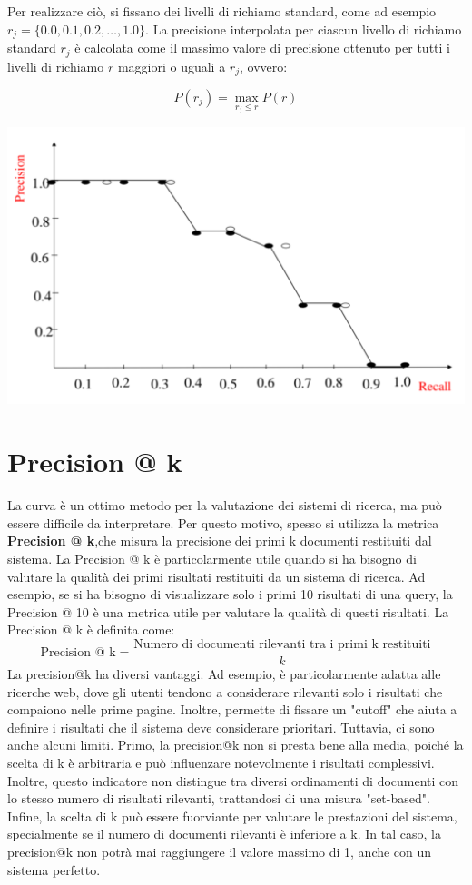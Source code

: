 \documentclass{report}
\begin{document}
	Per realizzare ciò, si fissano dei livelli di richiamo standard, come ad esempio \( r_j = \{0.0, 0.1, 0.2, \ldots, 1.0\} \). La precisione interpolata per ciascun livello di richiamo standard \( r_j \) è calcolata come il massimo valore di precisione ottenuto per tutti i livelli di richiamo \( r \) maggiori o uguali a \( r_j \), ovvero:
	
	\[
	P(r_j) = \max_{r_j \leq r} P(r)
	\]
	\begin{center}
		\includegraphics[scale=0.3]{assets/interpolated-pre-rec-graph.png}
	\end{center}

	\section{Precision @ k}
	La curva è un ottimo metodo per la valutazione dei sistemi di ricerca, ma può essere difficile da interpretare. Per questo motivo, spesso si utilizza la metrica \textbf{Precision @ k},che misura la precisione dei primi k documenti restituiti dal sistema. La Precision @ k è particolarmente utile quando si ha bisogno di valutare la qualità dei primi risultati restituiti da un sistema di ricerca. Ad esempio, se si ha bisogno di visualizzare solo i primi 10 risultati di una query, la Precision @ 10 è una metrica utile per valutare la qualità di questi risultati. La Precision @ k è definita come:
	\[
		\text{Precision @ k} = \frac{\text{Numero di documenti rilevanti tra i primi k restituiti}}{k}
	\]
	La precision@k ha diversi vantaggi. Ad esempio, è particolarmente adatta alle ricerche web, dove gli utenti tendono a considerare rilevanti solo i risultati che compaiono nelle prime pagine. Inoltre, permette di fissare un "cutoff" che aiuta a definire i risultati che il sistema deve considerare prioritari.
	Tuttavia, ci sono anche alcuni limiti. Primo, la precision@k non si presta bene alla media, poiché la scelta di k è arbitraria e può influenzare notevolmente i risultati complessivi. Inoltre, questo indicatore non distingue tra diversi ordinamenti di documenti con lo stesso numero di risultati rilevanti, trattandosi di una misura "set-based". Infine, la scelta di k può essere fuorviante per valutare le prestazioni del sistema, specialmente se il numero di documenti rilevanti è inferiore a k. In tal caso, la precision@k non potrà mai raggiungere il valore massimo di 1, anche con un sistema perfetto.
\end{document}
